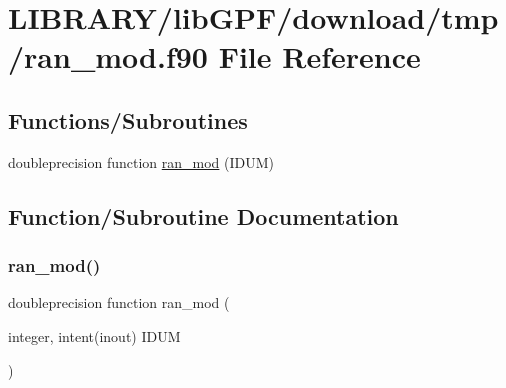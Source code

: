 \hypertarget{ran__mod_8f90}{}\section{L\+I\+B\+R\+A\+R\+Y/lib\+G\+P\+F/download/tmp/ran\+\_\+mod.f90 File Reference}
\label{ran__mod_8f90}
\subsection*{Functions/\+Subroutines}
\begin{DoxyCompactItemize}
\item 
doubleprecision function \hyperlink{ran__mod_8f90_afbd1e06fc345a9f59591e4c6d9939129}{ran\+\_\+mod} (I\+D\+UM)
\end{DoxyCompactItemize}


\subsection{Function/\+Subroutine Documentation}
\mbox{\label{ran__mod_8f90_afbd1e06fc345a9f59591e4c6d9939129}} 
\subsubsection{\texorpdfstring{ran\+\_\+mod()}{ran\_mod()}}
{\footnotesize\ttfamily doubleprecision function ran\+\_\+mod (\begin{DoxyParamCaption}\item[{integer, intent(inout)}]{I\+D\+UM }\end{DoxyParamCaption})}

